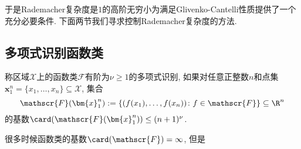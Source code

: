 于是Rademacher复杂度是$1$的高阶无穷小为满足Glivenko-Cantelli性质提供了一个充分必要条件. 
下面两节我们寻求控制Rademacher复杂度的方法. 

\subsection{多项式识别函数类}

\begin{definition}[多项式识别]
	称区域$\mathcal{X}$上的函数类$\mathscr{F}$有阶为$\nu \geq 1$的多项式识别, 如果对任意正整数$n$和点集$\bm{x}_1^n = \{x_1, \dots, x_n\} \subseteq \mathcal{X}$, 集合
	\begin{equation*}
		\mathscr{F}(\bm{x}_1^n) 
		:= \{(f(x_1), \dots, f(x_n)) \colon f \in \mathscr{F}\}
		\subseteq \R^n
	\end{equation*}
	的基数$\card(\mathscr{F}(\bm{x}_1^n)) \leq (n+1)^{\nu}$. 
\end{definition}

很多时候函数类的基数$\card(\mathscr{F}) = \infty$, 但是

